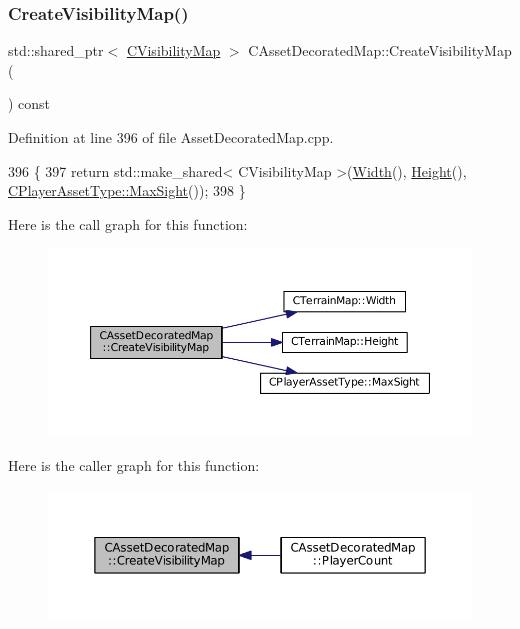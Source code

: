 \subsubsection{\texorpdfstring{Create\+Visibility\+Map()}{CreateVisibilityMap()}}
{\footnotesize\ttfamily std\+::shared\+\_\+ptr$<$ \hyperlink{classCVisibilityMap}{C\+Visibility\+Map} $>$ C\+Asset\+Decorated\+Map\+::\+Create\+Visibility\+Map (\begin{DoxyParamCaption}{ }\end{DoxyParamCaption}) const}



Definition at line 396 of file Asset\+Decorated\+Map.\+cpp.


\begin{DoxyCode}
396                                                                              \{
397     \textcolor{keywordflow}{return} std::make\_shared< CVisibilityMap >(\hyperlink{classCTerrainMap_a34cb754aa9b26e85a73377159f2527d7}{Width}(), \hyperlink{classCTerrainMap_ae5e4bf6507e0e3e9ac0322b43eed8a7a}{Height}(), 
      \hyperlink{classCPlayerAssetType_a1c1648ef0fdd2d112508c2ef9b7b70d1}{CPlayerAssetType::MaxSight}());
398 \}
\end{DoxyCode}
Here is the call graph for this function\+:
\nopagebreak
\begin{figure}[H]
\begin{center}
\leavevmode
\includegraphics[width=350pt]{classCAssetDecoratedMap_aa05e81ec37b4217053e8de050e47dba7_cgraph}
\end{center}
\end{figure}
Here is the caller graph for this function\+:
\nopagebreak
\begin{figure}[H]
\begin{center}
\leavevmode
\includegraphics[width=350pt]{classCAssetDecoratedMap_aa05e81ec37b4217053e8de050e47dba7_icgraph}
\end{center}
\end{figure}
\hypertarget{classCAssetDecoratedMap_a9d0fa2b32e4e8add6da83a7ebcfab6d8}{}\label{classCAssetDecoratedMap_a9d0fa2b32e4e8add6da83a7ebcfab6d8} 
